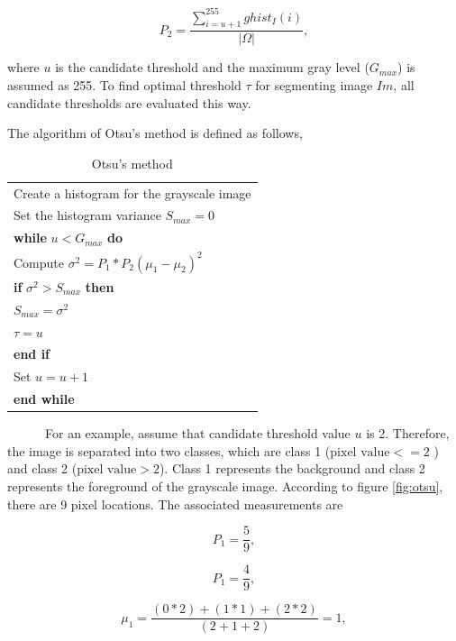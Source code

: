 \documentclass{article}
\begin{document}
\[P_2 = \frac{\sum_{i=u+1}^{255}ghist_I(i)}{|\Omega|},\]

where \(u\) is the candidate threshold and the maximum gray level
(\(G_{max}\)) is assumed as 255. To find optimal threshold \(\tau\) for
segmenting image \(Im\), all candidate thresholds are evaluated this
way.

The algorithm of Otsu's method is defined as follows,

\begin{table}[!ht]
\centering
\begin{tabular}{l}
\hline
Create a histogram for the grayscale image \\ 
Set the histogram variance $S_{max} = 0$                                             \\ \hline
\textbf{while} $u < G_{max}$ \textbf{do}                                             \\ \hline
Compute $\sigma^2 = P_1*P_2(\mu_1-\mu_2)^2$                                             \\ 
\textbf{if} $\sigma^2 > S_{max}$ \textbf{then}                                             \\ \hline
$S_{max} = \sigma^2$                                             \\
$\tau = u$                                             \\ \hline
\textbf{end if}                                             \\ 
Set $u = u+1$                                             \\ \hline
\textbf{end while}                                             \\ \hline
\end{tabular}
\caption{Otsu's method}
\label{tab:ot}
\end{table}

~~~~~~For an example, assume that candidate threshold value \(u\) is 2.
Therefore, the image is separated into two classes, which are class 1
(\(\text{pixel value} <= 2\) ) and class 2 (\(\text{pixel value} > 2\)).
Class 1 represents the background and class 2 represents the foreground
of the grayscale image. According to figure \ref{fig:otsu}, there are 9
pixel locations. The associated measurements are

\[P_1 = \frac{5}{9},\]

\[P_1 = \frac{4}{9},\]

\[\mu_1 = \frac{(0*2) +(1*1) + (2*2)}{(2+1+2)} = 1,\]
\end{document}
